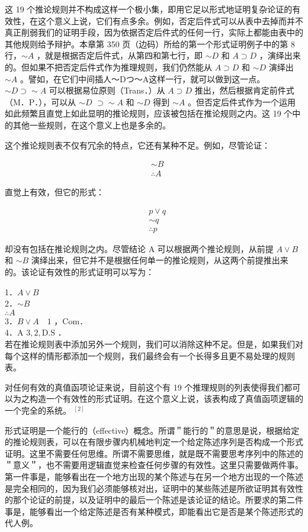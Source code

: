 这 19 个推论规则并不构成这样一个极小集，即用它足以形式地证明复杂论证的有效性，在这个意义上说，它们有点多余。例如，否定后件式可以从表中去掉而并不真正削弱我们的证明手段，因为依据否定后件式的任何一行，实际上都能由表中的其他规则给予辩护。本章第 350 页（边码）所给的第一个形式证明例子中的第 8 行，$\sim A$ ，就是根据否定后件式，从第四和第七行，即 $\sim D$ 和 $A \supset D$ ，演绎出来的。但如果不把否定后件式作为推理规则，我们仍然能从 $A \supset D$ 和 $\sim D$ 演绎出 $\sim A$ 。譬如，在它们中间插人～Dつ～A这样一行，就可以做到这一点。 $\sim D \supset \sim A$ 可以根据易位原则（Trans．）从 $A \supset D$ 推出，然后根据肯定前件式（M．P．），可以从 $\sim D$ $\supset \sim A$ 和 $\sim D$ 得到 $\sim A$ 。但否定后件式作为一个运用如此频繁且直觉上如此显明的推论规则，应该被包括在推论规则之内。这 19 个中的其他一些规则，在这个意义上也是多余的。

这个推论规则表不仅有冗余的特点，它还有某种不足。例如，尽管论证：

$$
\begin{aligned}
& \sim B \\
& \therefore A
\end{aligned}
$$

直觉上有效，但它的形式：

$$
\begin{aligned}
& p \vee q \\
& \sim q \\
& \therefore p
\end{aligned}
$$

却没有包括在推论规则之内。尽管结论 A 可以根据两个推论规则，从前提 $A \vee B$ 和 $\sim B$ 演绎出来，但它并不是根据任何单一的推论规则，从这两个前提推出来的。该论证有效性的形式证明可以写为：

1．$A \vee B$\\
2．$\sim B$\\
$\therefore A$\\
3．$B \vee A \quad 1$ ，Com．\\
4．A $3,2, \mathrm{D} . \mathrm{S}$ ．\\
若在推论规则表中添加另外一个规则，我们可以消除这种不足。但是，如果我们对每个这样的情形都添加一个规则，我们最终会有一个长得多且更不易处理的规则表。

对任何有效的真值函项论证来说，目前这个有 19 个推理规则的列表使得我们都可以为之构造一个有效性的形式证明。在这个意义上说，该表构成了真值函项逻辑的一个完全的系统。 ${ }^{[2]}$

形式证明是一个能行的（effective）概念。所谓＂能行的＂的意思是说，根据给定的推论规则表，可以在有限步骤内机械地判定一个给定陈述序列是否构成一个形式证明。这里不需要任何思维。所谓不需要思维，就是既不需要思考序列中的陈述的＂意义＂，也不需要用逻辑直觉来检查任何步骤的有效性。这里只需要做两件事。第一件事是，能够看出在一个地方出现的某个陈述与在另一个地方出现的一个陈述是完全相同的，因为我们必须能够核对出，证明中的某些陈述是所欲证明其有效性的那个论证的前提，以及证明中的最后一个陈述是该论证的结论。所要求的第二件事是，能够看出一个给定陈述是否有某种模式，即能看出它是否是某个陈述形式的代人例。

